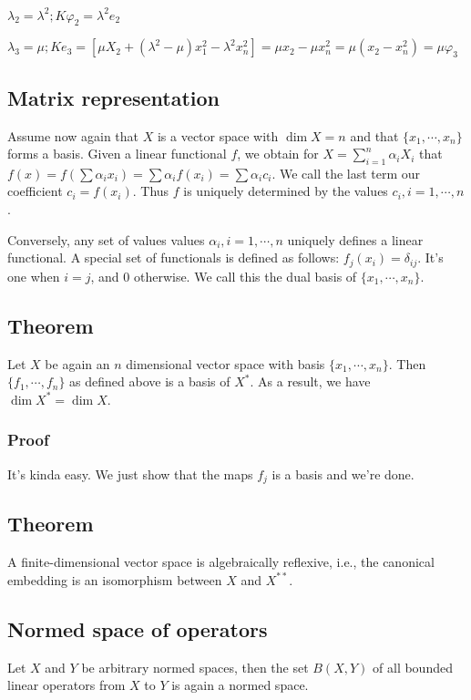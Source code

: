 \documentclass[11pt]{article}
\begin{document}
\(\lambda_2 = \lambda^2; K\varphi_2 = \lambda^2e_2\)

\(\lambda_3 = \mu; Ke_3 = [\mu X_2 + (\lambda^2 - \mu)x_1^2 - \lambda^2 x_n^2]
   = \mu x_2 - \mu x_n^2 = \mu(x_2 - x_n^2) = \mu \varphi_3\)
\subsection{Matrix representation}
\label{sec:org8ac0887}
Assume now again that \(X\) is a vector space with \(\dim X = n\) and that
\(\{x_1, \cdots, x_n\}\) forms a basis. Given a linear functional \(f\), we
obtain for \(X = \sum_{i=1}^{n} \alpha_i X_i\) that \(f(x) = f(\sum \alpha_i
   x_i) = \sum \alpha_i f(x_i) = \sum\alpha_ic_i\). We call the last term our
coefficient \(c_i = f(x_i)\). Thus \(f\) is uniquely determined by the values
\(c_i, i=1, \cdots, n\).

Conversely, any set of values values \(\alpha_i, i =1, \cdots, n\) uniquely
defines a linear functional. A special set of functionals is defined as
follows: \(f_j(x_i) = \delta_{ij}\). It's one when \(i=j\), and \(0\) otherwise. We
call this the dual basis of \(\{x_1, \cdots, x_n\}\).
\subsection{Theorem}
\label{sec:orgffe8fc7}
Let \(X\) be again an \(n\) dimensional vector space with basis \(\{x_1, \cdots,
   x_n\}\). Then \(\{f_1, \cdots, f_n\}\) as defined above is a basis of \(X^{*}\).
As a result, we have \(\dim X^{*} = \dim X\).
\subsubsection{Proof}
\label{sec:org70cc91a}
It's kinda easy. We just show that the maps \(f_j\) is a basis and we're done.
\subsection{Theorem}
\label{sec:org2de53b0}
A finite-dimensional vector space is algebraically reflexive, i.e., the
canonical embedding is an isomorphism between \(X\) and \(X^{**}\).
\subsection{Normed space of operators}
\label{sec:org0fd79c9}
Let \(X\) and \(Y\) be arbitrary normed spaces, then the set \(B(X, Y)\) of all
bounded linear operators from \(X\) to \(Y\) is again a normed space.
\end{document}
